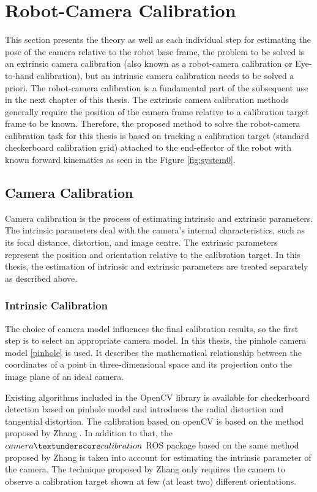 
\chapter{Robot-Camera Calibration}
\label{chap:robot}
This section presents the theory as well as each individual step for estimating the pose of the camera relative to the robot base frame, the problem to be solved is an extrinsic camera calibration (also known as a robot-camera calibration or Eye-to-hand calibration), but an intrinsic camera calibration needs to be solved a priori. The robot-camera calibration is a fundamental part of the subsequent use in the next chapter of this thesis. The extrinsic camera calibration methods generally require the position of the camera frame relative to a calibration target frame to be known. Therefore, the proposed method to solve the robot-camera calibration task for this thesis is based on tracking a calibration target (standard checkerboard calibration grid) attached to the end-effector of the robot with known forward kinematics as seen in the  Figure \ref{fig:system0}. 


\section{Camera Calibration}

Camera calibration is the process of estimating intrinsic and extrinsic parameters. The intrinsic parameters deal with the camera's internal characteristics, such as its focal distance, distortion, and image centre. The extrinsic parameters represent the position and orientation relative to the calibration target. In this thesis, the estimation of intrinsic and extrinsic parameters are treated separately as described above.

\subsection{Intrinsic Calibration}
The choice of camera model influences the final calibration results, so the first step is to select an appropriate camera model. In this thesis, the pinhole camera model \ref{pinhole} is used. It describes the mathematical relationship between the coordinates of a point in three-dimensional space and its projection onto the image plane of an ideal camera. 

Existing algorithms included in the OpenCV library is available for checkerboard detection based on pinhole model and introduces the radial distortion and tangential distortion. The calibration based on openCV is based on the method proposed by Zhang \cite{camCalib}. In addition to that, the $camera\textunderscore calibration$ ROS package \cite{camCalibRos}  based on the same method proposed by Zhang is taken into account for estimating the intrinsic parameter of the camera.
The technique proposed by Zhang only requires the camera to observe a calibration target shown at few (at least two) different orientations. 

